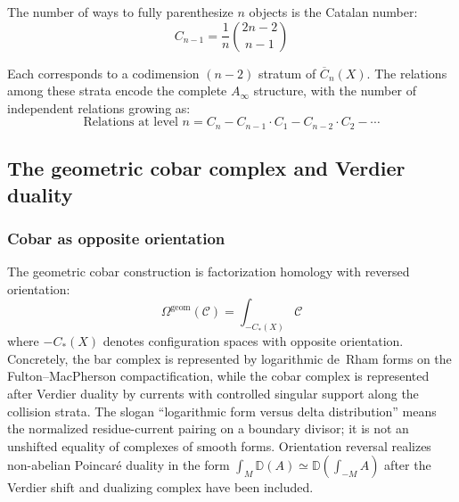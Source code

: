 \begin{theorem}\label{thm:catalan-parenthesization}
The number of ways to fully parenthesize $n$ objects is the Catalan number:
\[C_{n-1} = \frac{1}{n}\binom{2n-2}{n-1}\]

Each corresponds to a codimension $(n-2)$ stratum of $\overline{C}_n(X)$. The relations among these strata encode the complete $A_\infty$ structure, with the number of independent relations growing as:
\[\text{Relations at level } n = C_n - C_{n-1} \cdot C_1 - C_{n-2} \cdot C_2 - \cdots\]
\end{theorem}


\subsection{The geometric cobar complex and Verdier duality}

\subsubsection{Cobar as opposite orientation}

\begin{definition}\label{def:cobar-orientation}
The geometric cobar construction is factorization homology with reversed orientation:
\[\Omega^{\text{geom}}(\mathcal{C}) = \int_{-C_*(X)} \mathcal{C}\]
where $-C_*(X)$ denotes configuration spaces with opposite orientation.
Concretely, the bar complex is represented by logarithmic
de~Rham forms on the Fulton--MacPherson compactification, while the
cobar complex is represented after Verdier duality by currents with
controlled singular support along the collision strata. The slogan
``logarithmic form versus delta distribution'' means the normalized
residue-current pairing on a boundary divisor; it is not an
unshifted equality of complexes of smooth forms. Orientation reversal
realizes non-abelian Poincar\'e duality in the form
$\int_M \mathbb{D}(A) \simeq \mathbb{D}(\int_{-M} A)$ after the
Verdier shift and dualizing complex have been included.
\end{definition}

